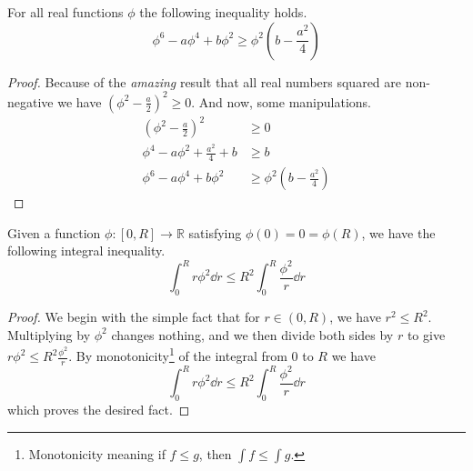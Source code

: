 \begin{lemma}\label{lem:ineq1}
For all real functions $\phi$ the following inequality holds.
\begin{equation}
\phi^6 - a\phi^4 + b\phi^2 \geq \phi^2\left(b - \frac{a^2}{4}\right)
\end{equation}
\end{lemma}
\begin{proof}
Because of the \textit{amazing} result that all real numbers squared are non-negative we have $\left(\phi^2 - \frac{a}{2}\right)^2\geq 0$. And now, some manipulations.
\begin{align*}
\left(\phi^2 - \frac{a}{2}\right)^2 & \geq 0 \\
\phi^4 - a\phi^2 + \frac{a^2}{4} + b & \geq b \\
\phi^6 - a\phi^4 + b\phi^2 & \geq \phi^2\left(b - \frac{a^2}{4}\right)
\end{align*}
\end{proof}
\begin{lemma}\label{lem:ineq2}
Given a function $\phi:[0,R]\to \mathbb{R}$ satisfying $\phi(0) = 0 = \phi(R)$, we have the following integral inequality.
\begin{equation}
\int_0^R r\phi^2\dd{r}\leq R^2\int_0^R\frac{\phi^2}{r}\dd{r}
\end{equation}
\end{lemma}
\begin{proof}
We begin with the simple fact that for $r\in(0,R)$, we have $r^2\leq R^2$. Multiplying by $\phi^2$ changes nothing, and we then divide both sides by $r$ to give $r\phi^2\leq R^2\frac{\phi^2}{r}$. By monotonicity\footnote{Monotonicity meaning if $f\leq g$, then $\int f\leq \int g$.} of the integral from $0$ to $R$ we have
\begin{equation}
\int_0^R r\phi^2\dd{r}\leq R^2\int_0^R\frac{\phi^2}{r}\dd{r}
\end{equation}
which proves the desired fact.
\end{proof}

